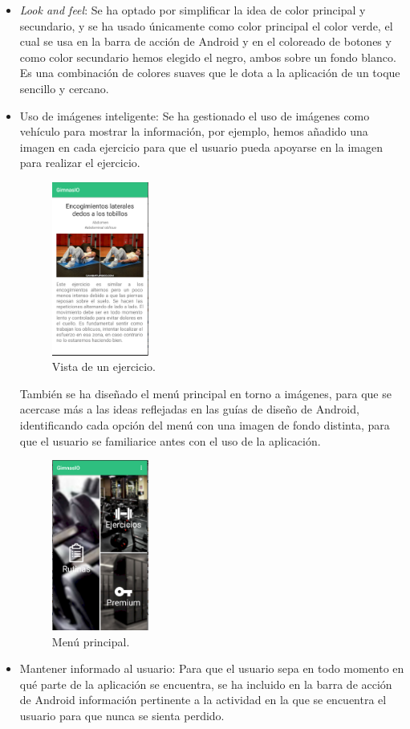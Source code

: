 \documentclass[11pt,a4paper]{report}
\begin{document}
\begin{itemize}
	\item \textit{Look and feel}: Se ha optado por simplificar la idea de color principal y secundario, y se ha usado únicamente como color principal el color verde, el cual se usa en la barra de acción de Android y en el coloreado de botones y como color secundario hemos elegido el negro, ambos sobre un fondo blanco. Es una combinación de colores suaves que le dota a la aplicación de un toque sencillo y cercano.

	\item Uso de imágenes inteligente: Se ha gestionado el uso de imágenes como vehículo para mostrar la información, por ejemplo, hemos añadido una imagen en cada ejercicio para que el usuario pueda apoyarse en la imagen para realizar el ejercicio.
	\begin{figure}[H]
		\centering
		\includegraphics[width=0.3\textwidth]{graficos/Usabilidad/Ejercicio.png}
		\caption{Vista de un ejercicio.}
	\end{figure}
	También se ha diseñado el menú principal en torno a imágenes, para que se acercase más a las ideas reflejadas en las guías de diseño de Android, identificando cada opción del menú con una imagen de fondo distinta, para que el usuario se familiarice antes con el uso de la aplicación.
	\begin{figure}[H]
		\centering
		\includegraphics[width=0.3\textwidth]{graficos/Usabilidad/Menu.png}
		\caption{Menú principal.}
	\end{figure}
	\item Mantener informado al usuario: Para que el usuario sepa en todo momento en qué parte de la aplicación se encuentra, se ha incluido en la barra de acción de Android información pertinente a la actividad en la que se encuentra el usuario para que nunca se sienta perdido.


\end{itemize}
\end{document}
